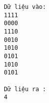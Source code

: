\begin{verbatim}
Dữ liệu vào:
1111
0000
1110
0010
1010
0101
1010
0101

Dữ liệu ra :
4
\end{verbatim}